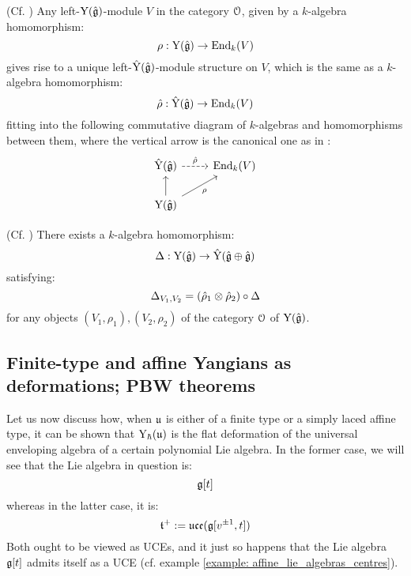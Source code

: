         \begin{lemma} \label{lemma: lifting_representations_of_affine_yangians_to_root_grading_completions}
            (Cf. \cite[Proposition 5.14]{guay_nakajima_wendlandt_affine_yangian_coproduct}) Any left-$\mathrm{Y}(\hat{\mathfrak{g}})$-module $V$ in the category $\mathcal{O}$, given by a $k$-algebra homomorphism:
                $$\rho: \mathrm{Y}(\hat{\mathfrak{g}}) \to \mathrm{End}_k(V)$$
            gives rise to a unique left-$\hat{\mathrm{Y}}(\hat{\mathfrak{g}})$-module structure on $V$, which is the same as a $k$-algebra homomorphism:
                $$\hat{\rho}: \hat{\mathrm{Y}}(\hat{\mathfrak{g}}) \to \mathrm{End}_k(V)$$
            fitting into the following commutative diagram of $k$-algebras and homomorphisms between them, where the vertical arrow is the canonical one as in \cite[Section 5, Lemma 5.3]{guay_nakajima_wendlandt_affine_yangian_coproduct}:
                $$
                    \begin{tikzcd}
                	{\hat{\rmY}(\hat{\g})} & {\End_k(V)} \\
                	{\rmY(\hat{\g})}
                	\arrow[from=2-1, to=1-1]
                	\arrow["{\hat{\rho}}", dashed, from=1-1, to=1-2]
                	\arrow["\rho"', from=2-1, to=1-2]
                    \end{tikzcd}
                $$
        \end{lemma}
        \begin{theorem} \label{theorem: hopf_coproduct_on_yangians}
            (Cf. \cite[Proposition 5.18]{guay_nakajima_wendlandt_affine_yangian_coproduct}) There exists a $k$-algebra homomorphism:
                $$\Delta: \mathrm{Y}(\hat{\mathfrak{g}}) \to \hat{\mathrm{Y}}(\hat{\mathfrak{g}} \oplus \hat{\mathfrak{g}})$$
            satisfying:
                $$\Delta_{V_1, V_2} = (\hat{\rho}_1 \tensor \hat{\rho}_2) \circ \Delta$$
            for any objects $(V_1, \rho_1), (V_2, \rho_2)$ of the category $\mathcal{O}$ of $\mathrm{Y}(\hat{\mathfrak{g}})$.
        \end{theorem}

        \begin{theorem} \label{theorem: hopf_coproduct_on_formal_yangians}
        \end{theorem}

    \subsection{Finite-type and affine Yangians as deformations; PBW theorems} \label{subsection: yangians_as_deformations}
        Let us now discuss how, when $\mathfrak{u}$ is either of a finite type or a simply laced affine type, it can be shown that $\mathrm{Y}_{\hbar}(\mathfrak{u})$ is the flat deformation of the universal enveloping algebra of a certain polynomial Lie algebra. In the former case, we will see that the Lie algebra in question is:
            $$\mathfrak{g}[t]$$
        whereas in the latter case, it is:
            $$\mathfrak{t}^{+} := \mathfrak{uce}(\mathfrak{g}[v^{\pm 1}, t])$$
        Both ought to be viewed as UCEs, and it just so happens that the Lie algebra $\mathfrak{g}[t]$ admits itself as a UCE (cf. example \ref{example: affine_lie_algebras_centres}).

